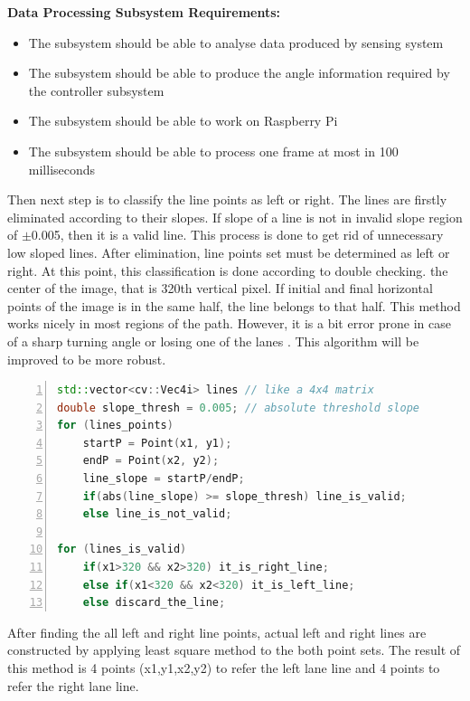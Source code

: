 \documentclass[a4paper,12pt]{article}
\begin{document}
	\textbf{Data Processing Subsystem Requirements:}	
	
	\begin{itemize}
		\item The subsystem should be able to analyse data produced by sensing system
		\item The subsystem should be able to produce the angle information required by the controller subsystem
		\item The subsystem should be able to work on Raspberry Pi
		\item The subsystem should be able to process one frame at most in 100 milliseconds
	\end{itemize}

	Then next step is to classify the line points as left or right. The lines are firstly eliminated according to their slopes. If slope of a line is not in invalid slope region of $\pm$0.005, then it is a valid line. This process is done to get rid of unnecessary low sloped lines. After elimination, line points set must be determined as left or right. At this point, this classification is done according to double checking. the center of the image, that is 320th vertical pixel. If initial and final horizontal points of the image is in the same half, the line belongs to that half. This method works nicely in most regions of the path. However, it is a bit error prone in case of a sharp turning angle or losing one of the lanes . This algorithm will be improved to be more robust.
	\begin{lstlisting}[language=C++,float=t,numbers=left,frame=single,caption=The Algorithm to Classify the Lane Lines as Right or Left, captionpos=b, label=sc:left-right-lines]
std::vector<cv::Vec4i> lines // like a 4x4 matrix
double slope_thresh = 0.005; // absolute threshold slope
for (lines_points)
	startP = Point(x1, y1);
	endP = Point(x2, y2);
	line_slope = startP/endP;
	if(abs(line_slope) >= slope_thresh) line_is_valid;
	else line_is_not_valid;

for (lines_is_valid)	
	if(x1>320 && x2>320) it_is_right_line;
	else if(x1<320 && x2<320) it_is_left_line;
	else discard_the_line;
	\end{lstlisting}
	
	After finding the all left and right line points, actual left and right lines are constructed by applying least square method to the both point sets. The result of this method is 4 points (x1,y1,x2,y2) to refer the left lane line and 4 points to refer the right lane line.
	
\end{document}
